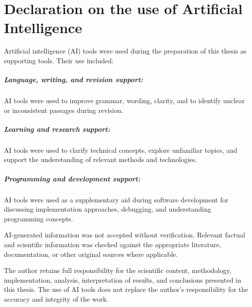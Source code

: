\chapter*{Declaration on the use of Artificial Intelligence}

Artificial intelligence (AI) tools were used during the preparation of this thesis as supporting tools. Their use included:

\paragraph{Language, writing, and revision support:} AI tools were used to improve grammar, wording, clarity, and to identify unclear or inconsistent passages during revision.
\paragraph{Learning and research support:} AI tools were used to clarify technical concepts, explore unfamiliar topics, and support the understanding of relevant methods and technologies.
\paragraph{Programming and development support:} AI tools were used as a supplementary aid during software development for discussing implementation approaches, debugging, and understanding programming concepts.

AI-generated information was not accepted without verification. Relevant factual and scientific information was checked against the appropriate literature, documentation, or other original sources where applicable.

The author retains full responsibility for the scientific content, methodology, implementation, analysis, interpretation of results, and conclusions presented in this thesis. The use of AI tools does not replace the author's responsibility for the accuracy and integrity of the work.